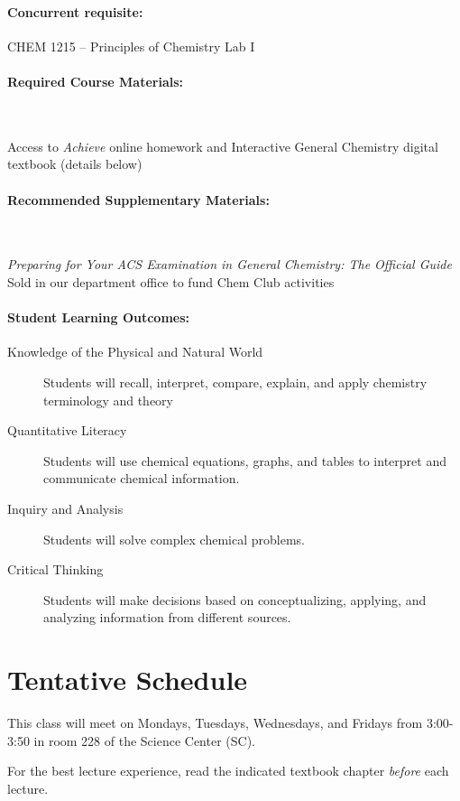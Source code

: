 \documentclass[12pt, letterpaper]{article}
\begin{document}
\paragraph{Concurrent requisite:}
CHEM 1215 -- Principles of Chemistry Lab I

\paragraph{Required Course Materials:} ~

Access to \emph{Achieve} online homework and Interactive General Chemistry digital textbook (details below)

\paragraph{Recommended Supplementary Materials:} ~

\emph{Preparing for Your ACS Examination in General Chemistry: The Official Guide} Sold in our department office to fund Chem Club activities

\paragraph{Student Learning Outcomes:}
\begin{description}
  \item[Knowledge of the Physical and Natural World] Students will recall, interpret, compare, explain, and apply chemistry terminology and theory
  \item[Quantitative Literacy] Students will use chemical equations, graphs, and tables to interpret and communicate chemical information.
  \item[Inquiry and Analysis] Students will solve complex chemical problems.
  \item[Critical Thinking] Students will make decisions based on conceptualizing, applying, and analyzing information from different sources.
\end{description}

\section*{Tentative Schedule}
This class will meet on Mondays, Tuesdays, Wednesdays, and Fridays from 3:00-3:50 in room 228 of the Science Center (SC).

\noindent For the best lecture experience, read the indicated textbook chapter \emph{before} each lecture.
\end{document}
